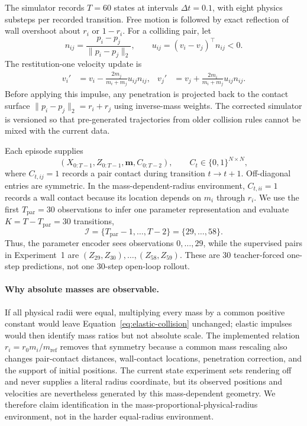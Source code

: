 The simulator records $T=60$ states at intervals $\Delta t=0.1$, with eight physics
substeps per recorded transition.  Free motion is followed by exact reflection of wall
overshoot about $r_i$ or $1-r_i$.  For a colliding pair, let
\begin{equation}
    n_{ij}=\frac{p_i-p_j}{\lVert p_i-p_j\rVert_2},
    \qquad
    u_{ij}=(v_i-v_j)^\top n_{ij}<0.
\end{equation}
The restitution-one velocity update is
\begin{align}
    v_i' &= v_i-\frac{2m_j}{m_i+m_j}u_{ij}n_{ij},
    &
    v_j' &= v_j+\frac{2m_i}{m_i+m_j}u_{ij}n_{ij}.
    \label{eq:elastic-collision}
\end{align}
Before applying this impulse, any penetration is projected back to the contact surface
$\lVert p_i-p_j\rVert_2=r_i+r_j$ using inverse-mass weights.  The corrected simulator is
versioned so that pre-generated trajectories from older collision rules cannot be mixed with
the current data.

Each episode supplies
\begin{equation}
    (X_{0:T-1},Z_{0:T-1},\boldsymbol{m},C_{0:T-2}),
    \qquad
    C_t\in\{0,1\}^{N\times N},
\end{equation}
where $C_{t,ij}=1$ records a pair contact during transition $t\rightarrow t+1$.
Off-diagonal entries are symmetric.  In the mass-dependent-radius environment,
$C_{t,ii}=1$ records a wall contact because its location depends on $m_i$ through $r_i$.
We use the first $T_{\mathrm{par}}=30$ observations to infer one parameter representation and
evaluate $K=T-T_{\mathrm{par}}=30$ transitions,
\begin{equation}
    \mathcal{I}=\{T_{\mathrm{par}}-1,\ldots,T-2\}=\{29,\ldots,58\}.
    \label{eq:transition-index-set}
\end{equation}
Thus, the parameter encoder sees observations $0,\ldots,29$, while the supervised pairs in
Experiment~1 are $(Z_{29},Z_{30}),\ldots,(Z_{58},Z_{59})$.  These are 30
teacher-forced one-step predictions, not one 30-step open-loop rollout.

\paragraph{Why absolute masses are observable.}
If all physical radii were equal, multiplying every mass by a common positive constant would
leave Equation~\eqref{eq:elastic-collision} unchanged; elastic impulses would then identify
mass ratios but not absolute scale.  The implemented relation
$r_i=r_0m_i/m_{\mathrm{ref}}$ removes that symmetry because a common mass rescaling also
changes pair-contact distances, wall-contact locations, penetration correction, and the support
of initial positions.  The current state experiment sets rendering off and never supplies a
literal radius coordinate, but its observed positions and velocities are nevertheless generated
by this mass-dependent geometry.  We therefore claim identification in the
mass-proportional-physical-radius environment, not in the harder equal-radius environment.


